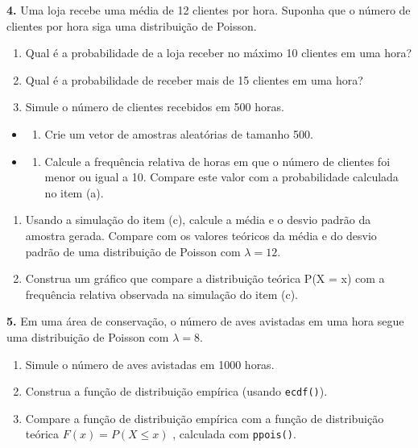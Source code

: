 \documentclass[
]{book}
\providecommand{\tightlist}{%
  \setlength{\itemsep}{0pt}\setlength{\parskip}{0pt}}
\begin{document}
\textbf{4.} Uma loja recebe uma média de 12 clientes por hora. Suponha que o número de clientes por hora siga uma distribuição de Poisson.

\begin{enumerate}
\def\labelenumi{(\alph{enumi})}
\item
  Qual é a probabilidade de a loja receber no máximo 10 clientes em uma hora?
\item
  Qual é a probabilidade de receber mais de 15 clientes em uma hora?
\item
  Simule o número de clientes recebidos em 500 horas.
\end{enumerate}

\begin{itemize}
\tightlist
\item
  \begin{enumerate}
  \def\labelenumi{(\roman{enumi})}
  \tightlist
  \item
    Crie um vetor de amostras aleatórias de tamanho 500.
  \end{enumerate}
\item
  \begin{enumerate}
  \def\labelenumi{(\roman{enumi})}
  \setcounter{enumi}{1}
  \tightlist
  \item
    Calcule a frequência relativa de horas em que o número de clientes foi menor ou igual a 10. Compare este valor com a probabilidade calculada no item (a).
  \end{enumerate}
\end{itemize}

\begin{enumerate}
\def\labelenumi{(\alph{enumi})}
\setcounter{enumi}{3}
\item
  Usando a simulação do item (c), calcule a média e o desvio padrão da amostra gerada. Compare com os valores teóricos da média e do desvio padrão de uma distribuição de Poisson com \(\lambda = 12\).
\item
  Construa um gráfico que compare a distribuição teórica P(X = x) com a frequência relativa observada na simulação do item (c).
\end{enumerate}

\textbf{5.} Em uma área de conservação, o número de aves avistadas em uma hora segue uma distribuição de Poisson com \(\lambda = 8\).

\begin{enumerate}
\def\labelenumi{(\alph{enumi})}
\item
  Simule o número de aves avistadas em 1000 horas.
\item
  Construa a função de distribuição empírica (usando \texttt{ecdf()}).
\item
  Compare a função de distribuição empírica com a função de distribuição teórica \(F(x) = P(X \leq x)\) , calculada com \texttt{ppois()}.
\end{enumerate}
\end{document}
